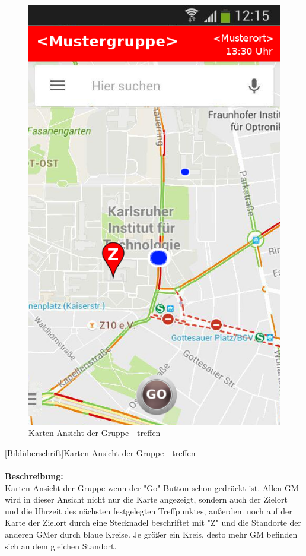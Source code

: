 \begin{figure}
	\caption{Karten-Ansicht der Gruppe - treffen}
\begin{center}
	\includegraphics[scale =0.5]{resources/images/map_Go.png}
\end{center}
\end{figure}
[Bildüberschrift]Karten-Ansicht der Gruppe - treffen\\ \\
\textbf{Beschreibung:}\\
Karten-Ansicht der Gruppe wenn der "Go"-Button schon gedrückt ist. Allen GM wird in dieser Ansicht nicht nur die Karte angezeigt, sondern auch der Zielort und die Uhrzeit des nächsten festgelegten Treffpunktes, außerdem noch auf der Karte der Zielort durch eine Stecknadel beschriftet mit "Z" und die Standorte der anderen GMer durch blaue Kreise. Je größer ein Kreis, desto mehr GM befinden sich an dem gleichen Standort.\\
